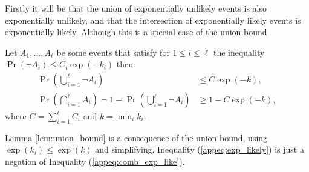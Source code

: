     Firstly it will be that the union of exponentially unlikely events is also exponentially unlikely, and that the intersection of exponentially likely events is exponentially likely. Although this is a special case of the union bound  
    \begin{lemma} \label{lem:union_bound}
        Let $A_1,...,A_{\ell}$ be some events that satisfy for $1\leq i \leq \ell$ the inequality $\Pr(\lnot A_i) \leq C_i\exp(-k_i)$ then:
        \begin{align}
            \Pr\left(\bigcup_{i=1}^\ell \lnot A_i\right) &\leq C\exp(-k), \label{appeq:comb_exp_like} \\
            \Pr\left(\bigcap_{i=1}^\ell A_i\right) = 1-\Pr\left(\bigcup_{i=1}^\ell \lnot A_i\right) &\geq 1-C\exp(-k), \label{appeq:exp_likely}
        \end{align}
        where $C=\sum_{i=1}^\ell C_i$ and $k = \min_i k_i$.
    \end{lemma}
    \begin{proofoutline}
        Lemma \ref{lem:union_bound} is a consequence of the union bound, using $\exp(k_i)\leq\exp(k)$ and simplifying. Inequality (\ref{appeq:exp_likely}) is just a negation of Inequality (\ref{appeq:comb_exp_like}).
    \end{proofoutline}






